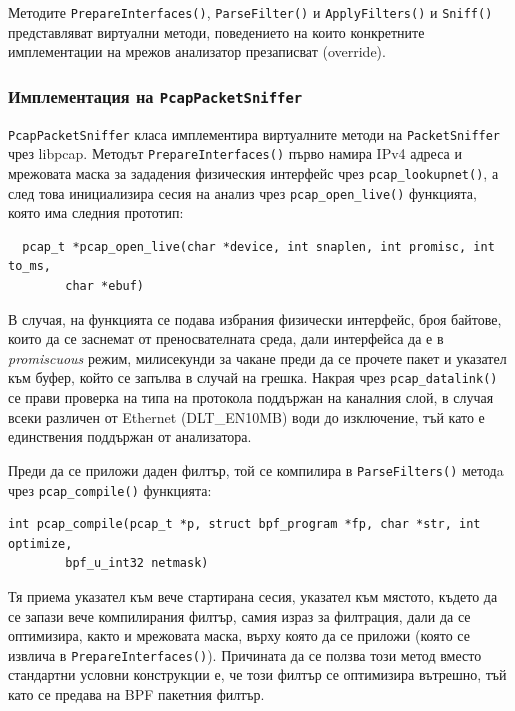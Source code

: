 \documentclass[12pt,a4paper,oneside]{book}
\begin{document}
Методите \texttt{PrepareInterfaces()}, \texttt{ParseFilter()} и
\texttt{ApplyFilters()} и \texttt{Sniff()} представляват виртуални методи,
поведението на които конкретните имплементации на мрежов анализатор презаписват
(override).

\subsubsection{Имплементация на \texttt{PcapPacketSniffer}}

\texttt{PcapPacketSniffer} класа имплементира виртуалните методи на
\texttt{PacketSniffer} чрез libpcap. Методът \texttt{PrepareInterfaces()} първо
намира IPv4 адреса и мрежовата маска за зададения физическия интерфейс чрез
\texttt{pcap\_lookupnet()}, а след това инициализира сесия на анализ чрез
\texttt{pcap\_open\_live()} функцията, която има следния прототип:

\begin{lstlisting}
  pcap_t *pcap_open_live(char *device, int snaplen, int promisc, int to_ms,
        char *ebuf)
\end{lstlisting}

В случая, на функцията се подава избрания физически интерфейс, броя байтове,
които да се заснемат от преносвателната среда, дали интерфейса да е в
\textit{promiscuous} режим, милисекунди за чакане преди да се прочете пакет и указател
към буфер, който се запълва в случай на грешка. Накрая чрез
\texttt{pcap\_datalink()} се прави проверка на типа на протокола поддържан на
каналния слой, в случая всеки различен от Ethernet (DLT\_EN10MB) води до изключение, тъй като е
единствения поддържан от анализатора.

Преди да се приложи даден филтър, той се компилира в \texttt{ParseFilters()} методa чрез
\texttt{pcap\_compile()} функцията:

\begin{lstlisting}
int pcap_compile(pcap_t *p, struct bpf_program *fp, char *str, int optimize, 
	    bpf_u_int32 netmask)
\end{lstlisting}

Тя приема указател към вече стартирана сесия, указател към мястото, където да се
запази вече компилирания филтър, самия израз за филтрация, дали да се
оптимизира, както и мрежовата маска, върху която да се приложи (която се извлича
в \texttt{PrepareInterfaces()}). Причината да се ползва този метод вместо
стандартни условни конструкции е, че този филтър се оптимизира вътрешно, тъй
като се предава на BPF пакетния филтър.
\end{document}
